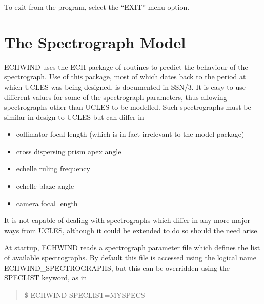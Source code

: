 To exit from the program, select the ``EXIT'' menu option.

\section{The Spectrograph Model}
\label{The Spectrograph Model}

ECHWIND uses the ECH package of routines to predict the behaviour of the
spectrograph. Use of this package, most of which dates back to the period at
which UCLES was being designed, is documented in SSN/3. It is easy to use
different values for some of the spectrograph parameters, thus allowing
spectrographs other than UCLES to be modelled. Such spectrographs must be
similar in design to UCLES but can differ in
\begin{itemize}
\item collimator focal length (which is in fact irrelevant to the model package)
\item cross dispersing prism apex angle
\item echelle ruling frequency
\item echelle blaze angle
\item camera focal length
\end{itemize}

It is not capable of dealing with spectrographs which differ in any more major
ways from UCLES, although it could be extended to do so should the need arise.

At startup, ECHWIND reads a spectrograph parameter file which defines the list
of available spectrographs. By default this file is accessed using the logical
name ECHWIND\_SPECTROGRAPHS, but this can be overridden using the SPECLIST
keyword, as in
\begin{quote}
\$ ECHWIND SPECLIST=MYSPECS
\end{quote}

